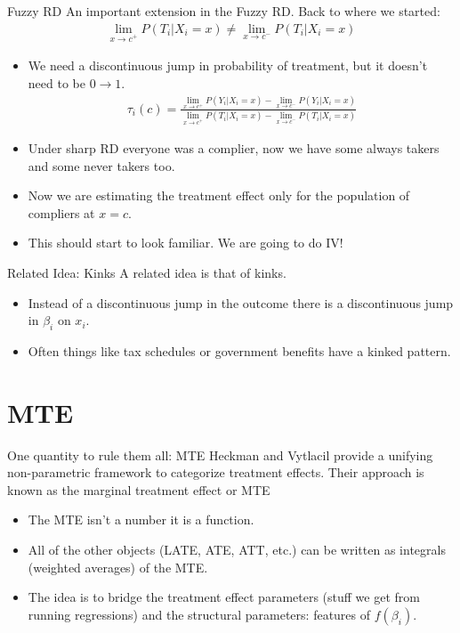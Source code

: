 \begin{frame}{Fuzzy RD}
An important extension in the \alert{Fuzzy RD}.   Back to where we started:
\begin{eqnarray*}
\lim_{x\rightarrow c^{+}} P(T_i | X_i = x) \neq \lim_{x\rightarrow c^{-}}P(T_i | X_i = x)
\end{eqnarray*}
\begin{itemize}
\item We need a discontinuous jump in probability of treatment, but it doesn't need to be $0 \rightarrow 1$.
\begin{eqnarray*}
\tau_i(c) = \frac{\lim_{x\rightarrow c^{+}} P(Y_i | X_i = x) - \lim_{x\rightarrow c^{-}}P(Y_i | X_i = x)}{\lim_{x\rightarrow c^{+}} P(T_i | X_i = x) - \lim_{x\rightarrow c^{-}}P(T_i | X_i = x)}
\end{eqnarray*}
\item Under sharp RD everyone was a \alert{complier}, now we have some \alert{always takers} and some \alert{never takers} too.
\item Now we are estimating the treatment effect only for the population of compliers at $x=c$.
\item This should start to look familiar. We are going to do IV!
\end{itemize}
\end{frame}

\begin{frame}{Related Idea: Kinks}
 A related idea is that of \alert{kinks}. 
\begin{itemize}
\item Instead of a discontinuous jump in the outcome there is a discontinuous jump in $\beta_i$ on $x_i$.
\item Often things like tax schedules or government benefits have a kinked pattern.
\end{itemize}
\end{frame}

\section{MTE}
\begin{frame}{One quantity to rule them all: MTE}
Heckman and Vytlacil provide a unifying non-parametric framework to categorize treatment effects. Their approach is known as the \alert{marginal treatment effect} or MTE
\begin{itemize}
\item The MTE isn't a number it is a \alert{function}.
\item All of the other objects (LATE, ATE, ATT, etc.) can be written as integrals (weighted averages) of the MTE.
\item The idea is to bridge the treatment effect parameters (stuff we get from running regressions) and the structural parameters: features of $f(\beta_i)$.
\end{itemize}
\end{frame}

